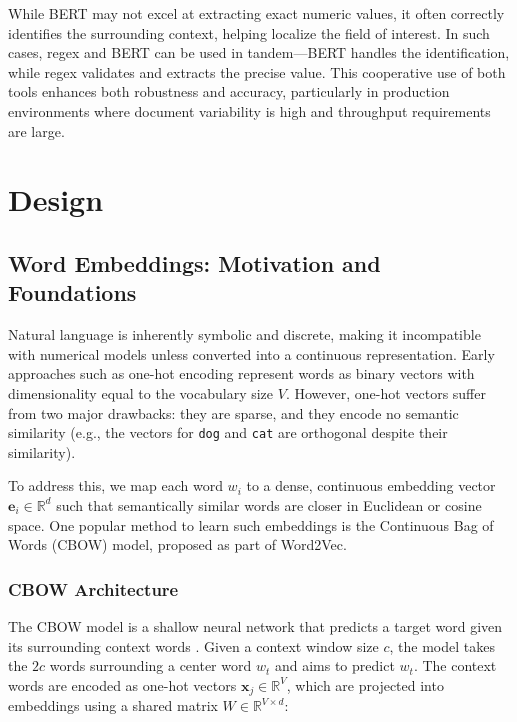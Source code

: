 \documentclass{article}
\begin{document}
While BERT may not excel at extracting exact numeric values, it often correctly identifies the surrounding context, helping localize the field of interest. In such cases, regex and BERT can be used in tandem—BERT handles the identification, while regex validates and extracts the precise value. This cooperative use of both tools enhances both robustness and accuracy, particularly in production environments where document variability is high and throughput requirements are large. \\

\section{Design}

\subsection{Word Embeddings: Motivation and Foundations}

Natural language is inherently symbolic and discrete, making it incompatible with numerical models unless converted into a continuous representation. Early approaches such as one-hot encoding represent words as binary vectors with dimensionality equal to the vocabulary size $V$. However, one-hot vectors suffer from two major drawbacks: they are sparse, and they encode no semantic similarity (e.g., the vectors for \texttt{dog} and \texttt{cat} are orthogonal despite their similarity).

To address this, we map each word $w_i$ to a dense, continuous embedding vector $\mathbf{e}_i \in \mathbb{R}^d$ such that semantically similar words are closer in Euclidean or cosine space.  One popular method to learn such embeddings is the Continuous Bag of Words (CBOW) model, proposed as part of Word2Vec.

\subsubsection{CBOW Architecture}

The CBOW model is a shallow neural network that predicts a target word given its surrounding context words \cite{mikolov2013efficient}. Given a context window size $c$, the model takes the $2c$ words surrounding a center word $w_t$ and aims to predict $w_t$. The context words are encoded as one-hot vectors $\mathbf{x}_j \in \mathbb{R}^V$, which are projected into embeddings using a shared matrix $W \in \mathbb{R}^{V \times d}$:
\end{document}
